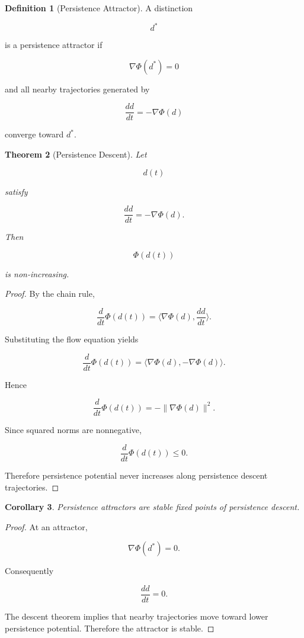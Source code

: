 \documentclass[12pt,oneside]{article}
\newtheorem{theorem}{Theorem}[section] \newtheorem{lemma}[theorem]{Lemma} \newtheorem{proposition}[theorem]{Proposition} \newtheorem{corollary}[theorem]{Corollary}
\theoremstyle{definition}
\newtheorem{definition}[theorem]{Definition} \newtheorem{axiom}[theorem]{Axiom} \newtheorem{remark}[theorem]{Remark} \newtheorem{example}[theorem]{Example}
\begin{document}
\begin{definition}[Persistence Attractor]

A distinction

\[
d^*
\]

is a persistence attractor if

\[
\nabla\Phi(d^*)
=0
\]

and all nearby trajectories generated by

\[
\frac{dd}{dt}
=
-\nabla\Phi(d)
\]

converge toward \(d^*\).

\end{definition}

\begin{theorem}[Persistence Descent]

Let

\[
d(t)
\]

satisfy

\[
\frac{dd}{dt}
=
-\nabla\Phi(d).
\]

Then

\[
\Phi(d(t))
\]

is non-increasing.

\end{theorem}

\begin{proof}

By the chain rule,

\[
\frac{d}{dt}\Phi(d(t))
=
\langle
\nabla\Phi(d),
\frac{dd}{dt}
\rangle.
\]

Substituting the flow equation yields

\[
\frac{d}{dt}\Phi(d(t))
=
\langle
\nabla\Phi(d),
-\nabla\Phi(d)
\rangle.
\]

Hence

\[
\frac{d}{dt}\Phi(d(t))
=
-
\|\nabla\Phi(d)\|^2.
\]

Since squared norms are nonnegative,

\[
\frac{d}{dt}\Phi(d(t))
\le 0.
\]

Therefore persistence potential never increases along persistence descent trajectories.

\end{proof}

\begin{corollary}

Persistence attractors are stable fixed points of persistence descent.

\end{corollary}

\begin{proof}

At an attractor,

\[
\nabla\Phi(d^*)=0.
\]

Consequently

\[
\frac{dd}{dt}=0.
\]

The descent theorem implies that nearby trajectories move toward lower persistence potential. Therefore the attractor is stable.

\end{proof}
\end{document}
